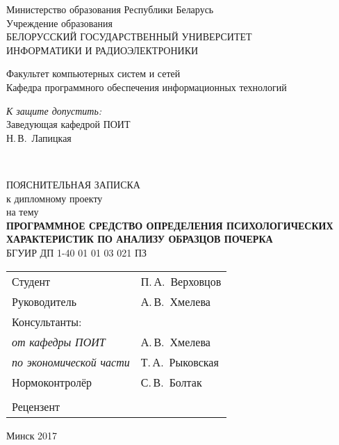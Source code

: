 \begin{titlepage}
  \begin{center}
    Министерство образования Республики Беларусь\\[1em]
    Учреждение образования\\
    БЕЛОРУССКИЙ ГОСУДАРСТВЕННЫЙ УНИВЕРСИТЕТ \\
    ИНФОРМАТИКИ И РАДИОЭЛЕКТРОНИКИ\\[1em]

    \begin{flushleft}
        Факультет компьютерных систем и сетей\\
        Кафедра программного обеспечения информационных технологий
    \end{flushleft}

    \begin{flushright}
      \begin{minipage}{0.4\textwidth}
        \textit{К защите допустить:}\\[0.8 em]
        Заведующая кафедрой ПОИТ\\[0.45 em]
        \underline{\hspace*{2.8 cm}} Н.\,В.~Лапицкая
      \end{minipage}\\[2.2 em]
    \end{flushright}

    {ПОЯСНИТЕЛЬНАЯ ЗАПИСКА}\\
    {к дипломному проекту}\\
    {на тему}\\[1em]
    \textbf{ПРОГРАММНОЕ СРЕДСТВО ОПРЕДЕЛЕНИЯ ПСИХОЛОГИЧЕСКИХ ХАРАКТЕРИСТИК ПО АНАЛИЗУ ОБРАЗЦОВ ПОЧЕРКА}\\[1em]


    {БГУИР ДП 1-40 01 01 03 021 ПЗ}\\[2em]

    \begin{tabular}{ p{}p{} }
      Студент & П.\,А.~Верховцов \\
      Руководитель & А.\,В.~Хмелева \\
      Консультанты: &\\
      \hspace*{3 ex}\emph{от кафедры ПОИТ} & А.\,В.~Хмелева \\
      \hspace*{3 ex}\emph{по экономической части} & Т.\,А.~Рыковская \\
      Нормоконтролёр & С.\,В.~Болтак\\
      & \\
      Рецензент &
    \end{tabular}

    \vfill
    {\normalsize Минск 2017}
  \end{center}
\end{titlepage}
